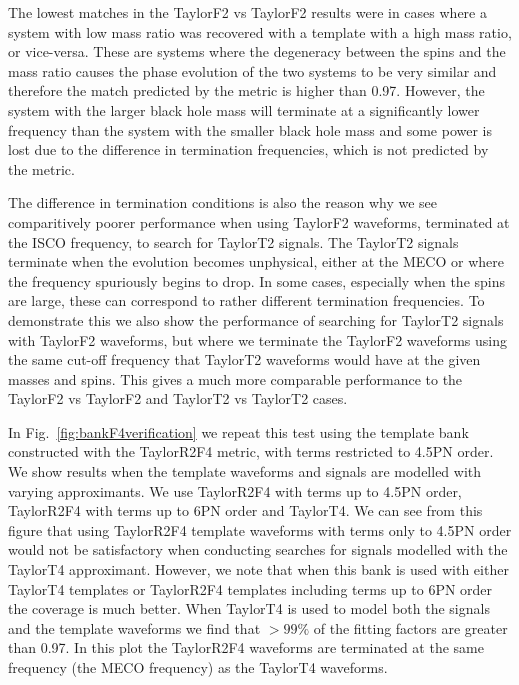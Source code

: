 The lowest matches in the TaylorF2 vs TaylorF2 results were in cases
where a system with low mass ratio was recovered with a template with a high
mass ratio, or vice-versa. These are systems where the degeneracy between the
spins and the mass ratio \cite{Baird:2012cu} causes
the phase evolution of the two systems to be very similar and therefore the
match predicted by the metric is higher than 0.97.
However, the system with the larger black hole mass will terminate at a 
significantly lower frequency than the system with the smaller black hole mass
and some power is lost due to the difference in termination frequencies, which
is not predicted by the metric.

The difference in termination conditions is also the reason why we see
comparitively poorer performance when using TaylorF2 waveforms, terminated
at the \ac{ISCO} frequency, to search for TaylorT2 signals. The TaylorT2
signals terminate when the evolution becomes unphysical,
either at the \ac{MECO} or where the frequency spuriously begins to drop. In
some cases, especially when the spins
are large, these can correspond to rather different termination frequencies. To
demonstrate this we also show the performance
of searching for TaylorT2 signals with TaylorF2 waveforms,
but where we terminate the TaylorF2 waveforms using the same cut-off frequency
that TaylorT2 waveforms would have at the given masses and spins.
This gives a much more comparable performance to the TaylorF2 vs TaylorF2
and TaylorT2 vs TaylorT2 cases.

In Fig.~\ref{fig:bankF4verification} we repeat this test using
the template bank constructed with the TaylorR2F4 metric, with terms restricted
to 4.5\ac{PN} order. We show results when the template waveforms and signals
are modelled with varying approximants. We use TaylorR2F4 with terms up to
4.5\ac{PN} order, TaylorR2F4 with terms up to 6\ac{PN} order and TaylorT4.
We can see from this figure that using TaylorR2F4 template waveforms
with terms only to 4.5\ac{PN} order would not be satisfactory when conducting
searches for signals modelled with the TaylorT4 approximant. However, we note
that when this bank is used with either TaylorT4 templates or TaylorR2F4
templates including terms up to 6\ac{PN} order the coverage is much better.
When TaylorT4 is used to model both the signals and the template waveforms we
find that $>99\%$ of the fitting factors are greater than
0.97. In this plot the TaylorR2F4 waveforms are terminated at
the same frequency (the \ac{MECO} frequency) as the TaylorT4 waveforms.

